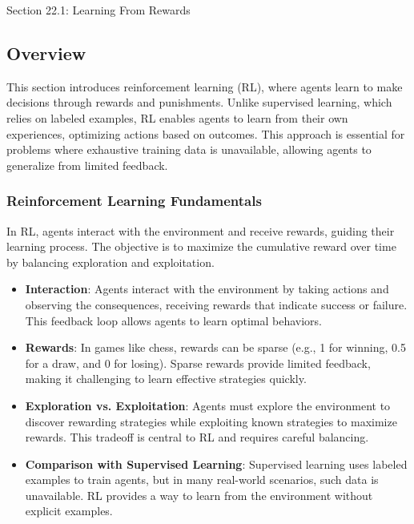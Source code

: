 \begin{notes}{Section 22.1: Learning From Rewards}
    \subsection*{Overview}

    This section introduces reinforcement learning (RL), where agents learn to make decisions through rewards and punishments. Unlike supervised learning, which relies on labeled examples, RL enables agents 
    to learn from their own experiences, optimizing actions based on outcomes. This approach is essential for problems where exhaustive training data is unavailable, allowing agents to generalize from limited 
    feedback.
    
    \subsubsection*{Reinforcement Learning Fundamentals}
    
    In RL, agents interact with the environment and receive rewards, guiding their learning process. The objective is to maximize the cumulative reward over time by balancing exploration and exploitation.
    
    \begin{highlight}
    
        \begin{itemize}
            \item \textbf{Interaction}: Agents interact with the environment by taking actions and observing the consequences, receiving rewards that indicate success or failure. This feedback loop allows 
            agents to learn optimal behaviors.
            \item \textbf{Rewards}: In games like chess, rewards can be sparse (e.g., 1 for winning, 0.5 for a draw, and 0 for losing). Sparse rewards provide limited feedback, making it challenging to 
            learn effective strategies quickly.
            \item \textbf{Exploration vs. Exploitation}: Agents must explore the environment to discover rewarding strategies while exploiting known strategies to maximize rewards. This tradeoff is central 
            to RL and requires careful balancing.
            \item \textbf{Comparison with Supervised Learning}: Supervised learning uses labeled examples to train agents, but in many real-world scenarios, such data is unavailable. RL provides a way 
            to learn from the environment without explicit examples.
        \end{itemize}
    

\end{highlight}
\end{notes}
